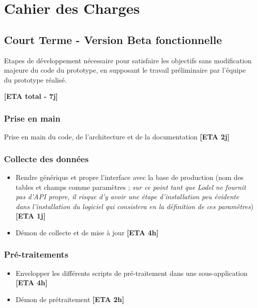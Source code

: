 \documentclass[11pt]{article}
\begin{document}
\section{Cahier des Charges}



\subsection{Court Terme - Version Beta fonctionnelle}

Etapes de développement nécessaire pour satisfaire les objectifs sans modification majeure du code du prototype, en supposant le travail préliminaire par l'équipe du prototype réalisé.

\textbf{[ETA total - 7j]}

\subsubsection*{Prise en main}

Prise en main du code, de l'architecture et de la documentation \textbf{[ETA 2j]}


\subsubsection*{Collecte des données}

\begin{itemize}
\item Rendre générique et propre l'interface avec la base de production (nom des tables et champs comme paramètres ; \textit{sur ce point tant que Lodel ne fournit pas d'API propre, il risque d'y avoir une étape d'installation peu évidente dans l'installation du logiciel qui consistera en la définition de ces paramètres}) \textbf{[ETA 1j]}
\item Démon de collecte et de mise à jour \textbf{[ETA 4h]}
\end{itemize}



\subsubsection*{Pré-traitements}


\begin{itemize}
\item Envelopper les différents scripts de pré-traitement dans une sous-application \textbf{[ETA 4h]}
\item Démon de prétraitement \textbf{[ETA 2h]}
\end{itemize}
\end{document}
